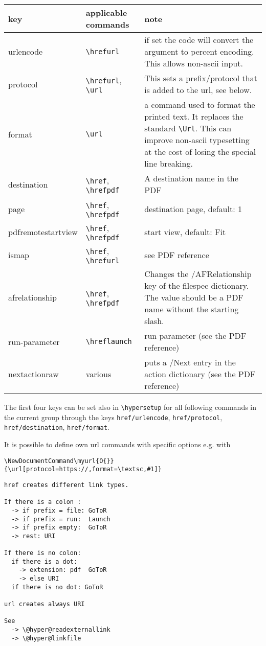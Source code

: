 \documentclass{article}
\newcommand\cs[1]{\texttt{\textbackslash #1}}
\begin{document}
\begin{tabular}{llp{6cm}}
key & applicable commands  & note\\\hline
urlencode & \cs{hrefurl}   & if set the code will convert the argument to percent encoding. This allows non-ascii input.\\
protocol &  \cs{hrefurl}, \cs{url} & This sets a prefix/protocol that is added to the url, see below. \\
format   & \cs{url}   & a command used to format the printed text. It replaces the standard \cs{Url}. This can improve non-ascii
typesetting at the cost of losing the special line breaking.\\
destination &  \cs{href}, \cs{hrefpdf} & A destination name in the PDF\\
page & \cs{href}, \cs{hrefpdf}        & destination page, default: 1\\
pdfremotestartview &\cs{href}, \cs{hrefpdf} & start view, default: Fit\\
ismap & \cs{href}, \cs{hrefurl}       & see PDF reference\\
afrelationship &  \cs{href}, \cs{hrefpdf} & Changes the /AFRelationship key of the filespec dictionary. The value should be a PDF name without the starting slash.\\
run-parameter & \cs{hreflaunch} & run parameter (see the PDF reference)\\
nextactionraw & various & puts a /Next entry in the action dictionary (see the PDF reference)\\
\end{tabular}


The first four keys can be set also in \cs{hypersetup} for all following commands in
the current group through the keys
\texttt{href/urlencode}, \texttt{href/protocol}, \texttt{href/destination}, \texttt{href/format}.

It is possible to define own url commands with specific options e.g. with

\begin{verbatim}
\NewDocumentCommand\myurl{O{}}{\url[protocol=https://,format=\textsc,#1]}
\end{verbatim}




\begin{verbatim}
href creates different link types.

If there is a colon :
  -> if prefix = file: GoToR
  -> if prefix = run:  Launch
  -> if prefix empty:  GoToR
  -> rest: URI

If there is no colon:
  if there is a dot:
    -> extension: pdf  GoToR
    -> else URI
  if there is no dot: GoToR

url creates always URI

See
  -> \@hyper@readexternallink
  -> \@hyper@linkfile
\end{verbatim}
\end{document}
